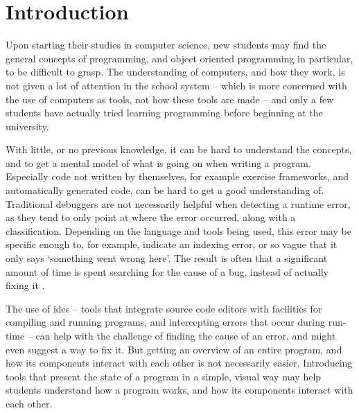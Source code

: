 \chapter{Introduction}\label{introduction}

Upon starting their studies in computer science, new students may find the general concepts of programming, and object oriented programming in particular, to be difficult to grasp.
The understanding of computers, and how they work, is not given a lot of attention in the school system -- which is more concerned with the use of computers as tools, not how these tools are made -- and only a few students have actually tried learning programming before beginning at the university. %

With little, or no previous knowledge, it can be hard to understand the concepts, and to get a mental model of what is going on when writing a program.
Especially code not written by themselves, for example exercise frameworks, and automatically generated code, can be hard to get a good understanding of.
Traditional debuggers are not necessarily helpful when detecting a runtime error, as they tend to only point at where the error occurred, along with a classification.
Depending on the language and tools being used, this error may be specific enough to, for example, indicate an indexing error, or so vague that it only says `something went wrong here'.
The result is often that a significant amount of time is spent searching for the cause of a bug, instead of actually fixing it \cite{ko2006}. %

The use of \glspl{ide} -- tools that integrate source code editors with facilities for compiling and running programs, and intercepting errors that occur during run-time -- can help with the challenge of finding the cause of an error, and might even suggest a way to fix it.
But getting an overview of an entire program, and how its components interact with each other is not necessarily easier.
Introducing tools that present the state of a program in a simple, visual way may help students understand how a program works, and how its components interact with each other.

